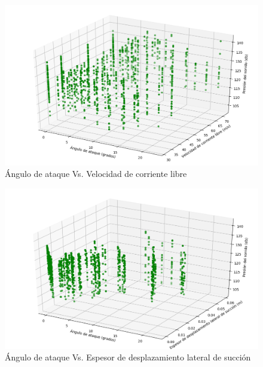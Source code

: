 \documentclass[12pt,spanish]{article} %
\begin{document}
\begin{figure}[H]
  \begin{center}
  \includegraphics[scale=.6]{Figure_6}
  \caption{Ángulo de ataque Vs. Velocidad de corriente libre}
  \label{fig:Figure_6}
  \end{center}
\end{figure}

\begin{figure}[H]
  \begin{center}
  \includegraphics[scale=.6]{Figure_7}
  \caption{Ángulo de ataque Vs. Espesor de desplazamiento lateral de succión}
  \label{fig:Figure_7}
  \end{center}
\end{figure}
\end{document}
